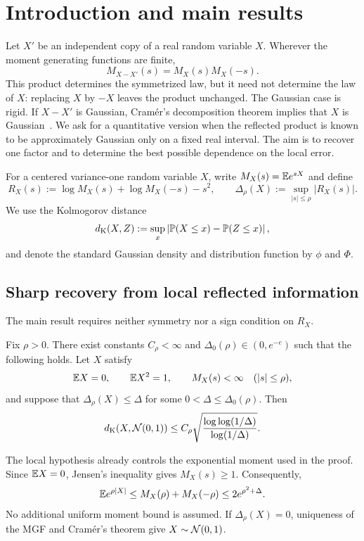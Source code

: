\section{Introduction and main results}\label{sec:intro}

Let $X'$ be an independent copy of a real random variable $X$. Wherever the moment generating functions are finite,
\[
M_{X-X'}(s)=M_X(s)M_X(-s).
\]
This product determines the symmetrized law, but it need not determine the law of $X$: replacing $X$ by $-X$ leaves the product unchanged. The Gaussian case is rigid. If $X-X'$ is Gaussian, Cram\'er's decomposition theorem implies that $X$ is Gaussian~\cite{Cramer1936}. We ask for a quantitative version when the reflected product is known to be approximately Gaussian only on a fixed real interval. The aim is to recover one factor and to determine the best possible dependence on the local error.

For a centered variance-one random variable $X$, write $M_X(s)=\mathbb E e^{sX}$ and define
\begin{equation}\label{eq:defect-intro}
R_X(s):=\log M_X(s)+\log M_X(-s)-s^2,
\qquad
\Delta_\rho(X):=\sup_{|s|\le\rho}|R_X(s)|.
\end{equation}
We use the Kolmogorov distance
\[
d_{\mathrm K}(X,Z):=\sup_x\left|\mathbb P(X\le x)-\mathbb P(Z\le x)\right|,
\]
and denote the standard Gaussian density and distribution function by $\phi$ and $\Phi$.

\subsection{Sharp recovery from local reflected information}

The main result requires neither symmetry nor a sign condition on $R_X$.
\begin{theorem}\label{thm:sharp-upper}
Fix $\rho>0$. There exist constants $C_\rho<\infty$ and $\Delta_0(\rho)\in(0,e^{-e})$ such that the following holds. Let $X$ satisfy
\[
\mathbb E X=0,\qquad \mathbb E X^2=1,
\qquad M_X(s)<\infty\quad(|s|\le\rho),
\]
and suppose that $\Delta_\rho(X)\le\Delta$ for some $0<\Delta\le\Delta_0(\rho)$. Then
\[
d_{\mathrm K}(X,\mathcal N(0,1))
\le C_\rho\sqrt{\frac{\log\log(1/\Delta)}{\log(1/\Delta)}}.
\]
\end{theorem}

The local hypothesis already controls the exponential moment used in the proof. Since $\mathbb E X=0$, Jensen's inequality gives $M_X(s)\ge1$. Consequently,
\begin{equation}\label{eq:auto-envelope-intro}
\mathbb E e^{\rho|X|}\le M_X(\rho)+M_X(-\rho)
\le2e^{\rho^2+\Delta}.
\end{equation}
No additional uniform moment bound is assumed. If $\Delta_\rho(X)=0$, uniqueness of the MGF and Cram\'er's theorem give $X\sim\mathcal N(0,1)$.

